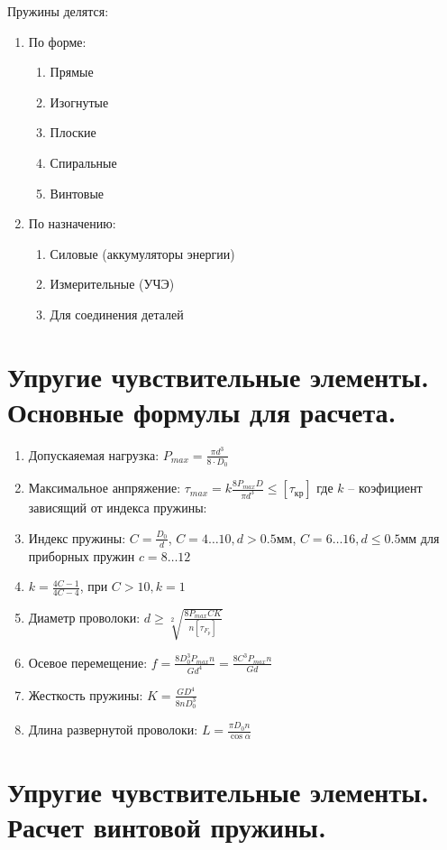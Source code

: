\documentclass{article}
\begin{document}
Пружины делятся:
\begin{enumerate}
	\item По форме:
	\begin{enumerate}
		\item Прямые
		\item Изогнутые
		\item Плоские
		\item Спиральные
		\item Винтовые
	\end{enumerate}
	\item По назначению:
	\begin{enumerate}
		\item Силовые (аккумуляторы энергии)
		\item Измерительные (УЧЭ)
		\item Для соединения деталей
	\end{enumerate}
\end{enumerate}

\section {Упругие чувствительные элементы. Основные формулы для расчета.}

\begin{enumerate}
	\item Допускаяемая нагрузка: $P_{max} = \frac{\pi d^3}{8 \cdot D_0} $
	\item Максимальное анпряжение: $\tau_{max} = k \frac{8 P_{max} D }{\pi d^3} \le [\tau_{кр}]$
	где $k$ -- коэфициент зависящий от индекса пружины:
	\item Индекс пружины: $C = \frac{D_0}{d} $, $C = 4 \dots 10, d > 0.5 мм$, $C = 6 \dots 16, d \le 0.5 мм$
	для приборных пружин $c = 8 \dots 12$
	\item $k = \frac{4 C - 1}{4 C - 4} $, при $C > 10, k = 1$
	\item Диаметр проволоки: $d \ge \sqrt[2]{ \frac{8 P_{max} C K}{n [\tau_{F_p}]} }$
	\item Осевое перемещение: $f = \frac{8 D_0^3 P_{max} n}{G d^4} = \frac{8 C^3 P_{max} n}{G d } $
	\item Жесткость пружины: $K = \frac{G D^4}{8 n D_0^3} $
	\item Длина развернутой проволоки: $L = \frac{\pi D_0 n}{\cos{ \alpha}} $
\end{enumerate}

\section {Упругие чувствительные элементы. Расчет винтовой пружины.}
\end{document}
